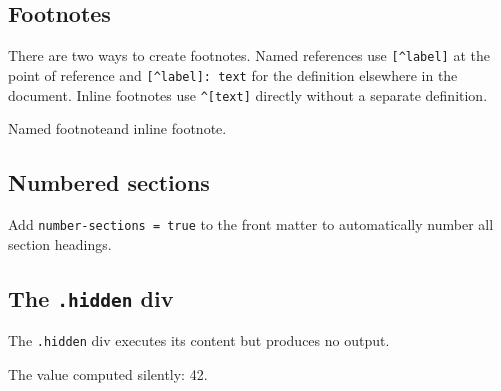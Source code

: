 \subsection{Footnotes}
\label{footnotes}

There are two ways to create footnotes. Named references use \texttt{{[}\^{}label{]}} at the point of reference and \texttt{{[}\^{}label{]}: text} for the definition elsewhere in the document. Inline footnotes use \texttt{\^{}{[}text{]}} directly without a separate definition.

Named footnote\footnotemark[2] and inline footnote\footnotemark[3].

\subsection{Numbered sections}
\label{numbered-sections}

Add \texttt{number-sections = true} to the front matter to automatically number all section headings.

\subsection{The \texttt{.hidden} div}
\label{the-div}

The \texttt{.hidden} div executes its content but produces no output.


The value computed silently: 42.

